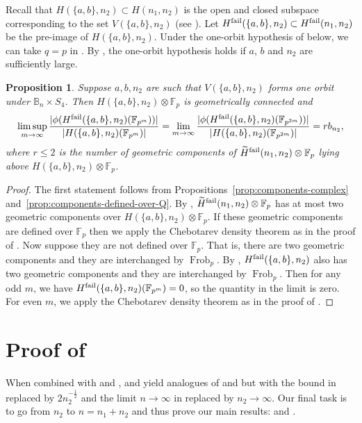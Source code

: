 \documentclass{amsart}
\numberwithin{equation}{section} \numberwithin{figure}{section}
\DeclareMathOperator{\Frob}{Frob}
\newcommand\FF{\mathbb{F}}
\theoremstyle{one}
\newtheorem{proposition}[theorem]{\textbf{Proposition}}
\theoremstyle{definition}
\begin{document}
Recall that \(H(\{a,b\},n_2) \subset H(n_1,n_2)\) is the open and closed subspace corresponding to the set \(V(\{a,b\},n_2)\) (see ).
Let \(H^{\rm fail}(\{a,b\},n_2) \subset H^{\rm fail}(n_1,n_2)\) be the pre-image of \(H(\{a,b\},n_2)\).
Under the one-orbit
hypothesis of  below, we can take $q=p$ in . 
By , the one-orbit hypothesis holds if \(a\), \(b\) and \(n_2\) are sufficiently large.
\begin{proposition}\label{prop:precise-q}
  Suppose \(a,b,n_2\) are such that \(V(\{a,b\},n_2)\) forms one orbit under \({\mathbb{B}_n} \times S_4\).
  Then \(H(\{a,b\}, n_2) \otimes \FF_p\) is geometrically connected and
  \[ \limsup_{m \to \infty} \frac{|\phi(H^{\rm fail}(\{a,b\},n_2)(\FF_{p^m}))|}{|H(\{a,b\},n_2)(\FF_{p^m})|} =\lim_{m \to \infty} \frac{|\phi(H^{\rm fail}(\{a,b\},n_2)(\FF_{p^{2m}}))|}{|H(\{a,b\},n_2)(\FF_{p^{2m}})|}= r b_{n_2},\]
   where $r\leq 2$ is the number of geometric components of \(\widetilde H^{\rm fail}(n_1,n_2) \otimes \FF_p\) lying above \(H(\{a,b\}, n_2) \otimes \FF_p\). 
\end{proposition}
\begin{proof}
  The first statement follows from Propositions~\ref{prop:components-complex} and~\ref{prop:components-defined-over-Q}.
  By , \(\widetilde H^{\rm fail}(n_1,n_2) \otimes \FF_p\) has at most two geometric components over \(H(\{a,b\}, n_2) \otimes \FF_p\).
  If these geometric components are defined over \(\FF_p\) then we apply the Chebotarev density theorem as in the proof of .
  Now suppose they are not defined over \(\FF_p\).
  That is, there are two geometric components and they are interchanged by \(\Frob_p\).
  By , \(H^{\rm fail}(\{a,b\},n_2)\) also has two geometric components and they are interchanged by \(\Frob_p\).
  Then for any odd \(m\), we have \(H^{\rm fail}(\{a,b\},n_2)(\FF_{p^m}) = 0\), so the quantity in the limit is zero.
  For even \(m\), we apply the Chebotarev density theorem as in the proof of .
\end{proof}

\section{Proof of~}\label{sec: n to infinity}

When combined with  and ,  and  yield analogues of  and  but with the bound in  replaced by $2n_2^{-\frac{1}{2}}$ and the limit $n\to\infty$ in  replaced by $n_2\to \infty$. Our final task is to go from $n_2$ to $n=n_1+n_2$ and thus prove our main results:  and .
\end{document}
